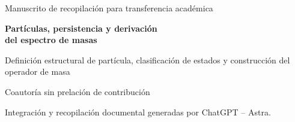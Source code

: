 \thispagestyle{plain}
\begin{center}
{\fontsize{10}{12}\selectfont Manuscrito de recopilación para transferencia académica\par}
\vspace{12mm}
{\fontsize{17}{20.5}\selectfont\bfseries Partículas, persistencia y derivación\\
del espectro de masas\par}
\vspace{6pt}
{\fontsize{11}{13.5}\selectfont Definición estructural de partícula, clasificación de estados y construcción del operador de masa\par}
\vspace{11pt}
{\fontsize{11.5}{14}\selectfont\Autores\par}
\vspace{4pt}
{\fontsize{8}{10}\selectfont Coautoría sin prelación de contribución\par}
\vspace{3pt}
{\fontsize{7.5}{9.5}\selectfont Integración y recopilación documental generadas por ChatGPT -- Astra.\par}
\end{center}
\vspace{7pt}
